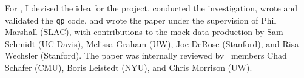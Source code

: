 \begin{enumerate}
{\item For , I devised the idea for the project, conducted the investigation, wrote and validated the \texttt{qp} code, and wrote the paper under the supervision of Phil Marshall (SLAC), with contributions to the mock data production by Sam Schmidt (UC Davis), Melissa Graham (UW), Joe DeRose (Stanford), and Risa Wechsler (Stanford).
	The paper was internally reviewed by \desc\ members Chad Schafer (CMU), Boris Leistedt (NYU), and Chris Morrison (UW).}

\end{enumerate}
